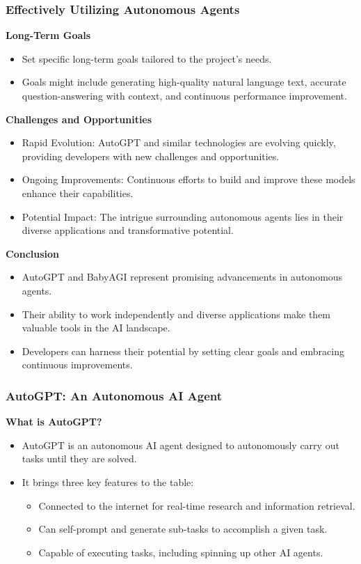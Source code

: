 \begin{frame}[fragile]
\frametitle{Effectively Utilizing Autonomous Agents}

\textbf{Long-Term Goals}
\begin{itemize}
    \item Set specific long-term goals tailored to the project's needs.
    \item Goals might include generating high-quality natural language text, accurate question-answering with context, and continuous performance improvement.
\end{itemize}

\textbf{Challenges and Opportunities}
\begin{itemize}
    \item Rapid Evolution: AutoGPT and similar technologies are evolving quickly, providing developers with new challenges and opportunities.
    \item Ongoing Improvements: Continuous efforts to build and improve these models enhance their capabilities.
    \item Potential Impact: The intrigue surrounding autonomous agents lies in their diverse applications and transformative potential.
\end{itemize}

\textbf{Conclusion}
\begin{itemize}
    \item AutoGPT and BabyAGI represent promising advancements in autonomous agents.
    \item Their ability to work independently and diverse applications make them valuable tools in the AI landscape.
    \item Developers can harness their potential by setting clear goals and embracing continuous improvements.
\end{itemize}

\end{frame}

\begin{frame}[fragile]
\frametitle{AutoGPT: An Autonomous AI Agent}

\textbf{What is AutoGPT?}
\begin{itemize}
    \item AutoGPT is an autonomous AI agent designed to autonomously carry out tasks until they are solved.
    \item It brings three key features to the table:
    \begin{itemize}
        \item Connected to the internet for real-time research and information retrieval.
        \item Can self-prompt and generate sub-tasks to accomplish a given task.
        \item Capable of executing tasks, including spinning up other AI agents.
    \end{itemize}
\end{itemize}

\end{frame}

